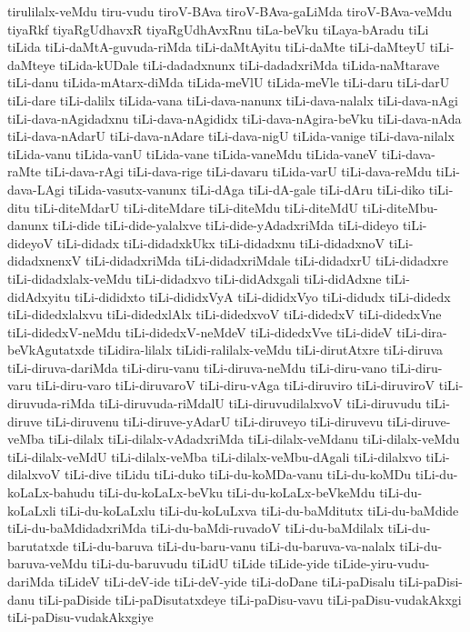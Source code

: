 {tirulilalx-veMdu
tiru-vudu
tiroV-BAva
tiroV-BAva-gaLiMda
tiroV-BAva-veMdu
tiyaRkf
tiyaRgUdhavxR
tiyaRgUdhAvxRnu
tiLa-beVku
tiLaya-bAradu
tiLi
tiLida
tiLi-daMtA-guvuda-riMda
tiLi-daMtAyitu
tiLi-daMte
tiLi-daMteyU
tiLi-daMteye
tiLida-kUDale
tiLi-dadadxnunx
tiLi-dadadxriMda
tiLida-naMtarave
tiLi-danu
tiLida-mAtarx-diMda
tiLida-meVlU
tiLida-meVle
tiLi-daru
tiLi-darU
tiLi-dare
tiLi-dalilx
tiLida-vana
tiLi-dava-nanunx
tiLi-dava-nalalx
tiLi-dava-nAgi
tiLi-dava-nAgidadxnu
tiLi-dava-nAgididx
tiLi-dava-nAgira-beVku
tiLi-dava-nAda
tiLi-dava-nAdarU
tiLi-dava-nAdare
tiLi-dava-nigU
tiLida-vanige
tiLi-dava-nilalx
tiLida-vanu
tiLida-vanU
tiLida-vane
tiLida-vaneMdu
tiLida-vaneV
tiLi-dava-raMte
tiLi-dava-rAgi
tiLi-dava-rige
tiLi-davaru
tiLida-varU
tiLi-dava-reMdu
tiLi-dava-LAgi
tiLida-vasutx-vanunx
tiLi-dAga
tiLi-dA-gale
tiLi-dAru
tiLi-diko
tiLi-ditu
tiLi-diteMdarU
tiLi-diteMdare
tiLi-diteMdu
tiLi-diteMdU
tiLi-diteMbu-danunx
tiLi-dide
tiLi-dide-yalalxve
tiLi-dide-yAdadxriMda
tiLi-dideyo
tiLi-dideyoV
tiLi-didadx
tiLi-didadxkUkx
tiLi-didadxnu
tiLi-didadxnoV
tiLi-didadxnenxV
tiLi-didadxriMda
tiLi-didadxriMdale
tiLi-didadxrU
tiLi-didadxre
tiLi-didadxlalx-veMdu
tiLi-didadxvo
tiLi-didAdxgali
tiLi-didAdxne
tiLi-didAdxyitu
tiLi-dididxto
tiLi-dididxVyA
tiLi-dididxVyo
tiLi-didudx
tiLi-didedx
tiLi-didedxlalxvu
tiLi-didedxlAlx
tiLi-didedxvoV
tiLi-didedxV
tiLi-didedxVne
tiLi-didedxV-neMdu
tiLi-didedxV-neMdeV
tiLi-didedxVve
tiLi-dideV
tiLi-dira-beVkAgutatxde
tiLidira-lilalx
tiLidi-ralilalx-veMdu
tiLi-dirutAtxre
tiLi-diruva
tiLi-diruva-dariMda
tiLi-diru-vanu
tiLi-diruva-neMdu
tiLi-diru-vano
tiLi-diru-varu
tiLi-diru-varo
tiLi-diruvaroV
tiLi-diru-vAga
tiLi-diruviro
tiLi-diruviroV
tiLi-diruvuda-riMda
tiLi-diruvuda-riMdalU
tiLi-diruvudilalxvoV
tiLi-diruvudu
tiLi-diruve
tiLi-diruvenu
tiLi-diruve-yAdarU
tiLi-diruveyo
tiLi-diruvevu
tiLi-diruve-veMba
tiLi-dilalx
tiLi-dilalx-vAdadxriMda
tiLi-dilalx-veMdanu
tiLi-dilalx-veMdu
tiLi-dilalx-veMdU
tiLi-dilalx-veMba
tiLi-dilalx-veMbu-dAgali
tiLi-dilalxvo
tiLi-dilalxvoV
tiLi-dive
tiLidu
tiLi-duko
tiLi-du-koMDa-vanu
tiLi-du-koMDu
tiLi-du-koLaLx-bahudu
tiLi-du-koLaLx-beVku
tiLi-du-koLaLx-beVkeMdu
tiLi-du-koLaLxli
tiLi-du-koLaLxlu
tiLi-du-koLuLxva
tiLi-du-baMditutx
tiLi-du-baMdide
tiLi-du-baMdidadxriMda
tiLi-du-baMdi-ruvadoV
tiLi-du-baMdilalx
tiLi-du-barutatxde
tiLi-du-baruva
tiLi-du-baru-vanu
tiLi-du-baruva-va-nalalx
tiLi-du-baruva-veMdu
tiLi-du-baruvudu
tiLidU
tiLide
tiLide-yide
tiLide-yiru-vudu-dariMda
tiLideV
tiLi-deV-ide
tiLi-deV-yide
tiLi-doDane
tiLi-paDisalu
tiLi-paDisi-danu
tiLi-paDiside
tiLi-paDisutatxdeye
tiLi-paDisu-vavu
tiLi-paDisu-vudakAkxgi
tiLi-paDisu-vudakAkxgiye
}

